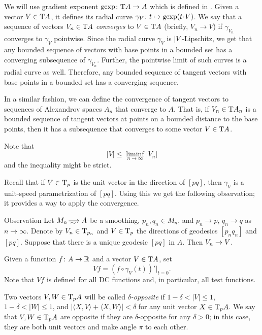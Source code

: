 We will use gradient exponent $\mathop{\rm gexp}\colon \mathrm{T} A\to A$ which is defined in \cite{AKP}.
Given a vector $V\in \mathrm{T} A$, it defines its radial curve $\gamma_{V}\:t\zz\mapsto \gexp (t\cdot V)$.
We say that a sequence of vectors $V_n\in \mathrm{T} A$ \emph{converges} to $V\in \mathrm{T} A$ (briefly, $V_n\to V$) if $\gamma_{V_n}$ converges to $\gamma_V$ pointwise.
Since the radial curve $\gamma_V$ is $|V|$-Lipschitz, we get that any bounded sequence of vectors with base points in a bounded set has a converging subsequence of $\gamma_{V_n}$.
Further, the pointwise limit of such curves is a radial curve as well.
Therefore, any bounded sequence of tangent vectors with base points in a bounded set has a converging sequence.

In a similar fashion, we can define the convergence of tangent vectors to sequences of Alexandrov spaces $A_n$ that converge to $A$.
That is, if $V_n\in \mathrm{T} A_n$ is a bounded sequence of tangent vectors at points on a bounded distance to the base points, then it has a subsequence that converges to some vector $V\in \mathrm{T} A$.

Note that 
\[|V|\le \liminf_{n\to\infty} |V_n|\]
and the inequality might be strict.

Recall that if $V\in \mathrm{T}_p$ is the unit vector in the direction of $[pq]$, then $\gamma_V$ is a unit-speed parametrization of $[pq]$.
Using this we get the following observation;
it provides a way to apply the convergence.

\begin{thm}{Observation}\label{obs:unique-geod}
Let $M_n\smooths{} A$ be a smoothing, $p_n,q_n\in M_n$, and $p_n\to p$, $q_n\to q$ as $n\to \infty$.
Denote by $V_n\in \mathrm{T}_{p_n}$ and $V\in \mathrm{T}_p$ the directions of geodesics $[p_nq_n]$ and $[pq]$.
Suppose that there is a unique geodesic $[pq]$ in $A$.
Then $V_n\zz\to V$.
\end{thm}



Given a function $f\colon A\to \mathbb{R}$ and a vector $V\in \mathrm{T} A$, set
\[Vf=(f\circ\gamma_V(t))'|_{t=0}.\]
Note that $Vf$ is defined for all DC functions and, in particular, all test functions.

Two vectors $V,W\in \mathrm{T}_pA$ will be called \emph{$\delta$-opposite} if
$1-\delta< |V|\le 1$,
$1-\delta< |W|\le 1$,
and $|\langle X,V\rangle +\langle X,W\rangle|<\delta$ for any unit vector $X\in \mathrm{T}_p A$.
We say that $V,W\in \mathrm{T}_pA$ are opposite if they are $\delta$-opposite for any $\delta>0$;
in this case, they are both unit vectors and make angle $\pi$ to each other.

